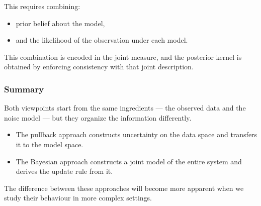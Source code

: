 \documentclass[11pt]{article}
\theoremstyle{remark}
\begin{document}
This requires combining:
\begin{itemize}
    \item prior belief about the model,
    \item and the likelihood of the observation under each model.
\end{itemize}

This combination is encoded in the joint measure, and the posterior kernel is obtained by enforcing consistency with that joint description.

\vspace{2mm}

\subsubsection{Summary}

Both viewpoints start from the same ingredients --- the observed data and the noise model --- but they organize the information differently.

\begin{itemize}
    \item The pullback approach constructs uncertainty on the data space and transfers it to the model space.
    \item The Bayesian approach constructs a joint model of the entire system and derives the update rule from it.
\end{itemize}

The difference between these approaches will become more apparent when we study their behaviour in more complex settings.
\end{document}
